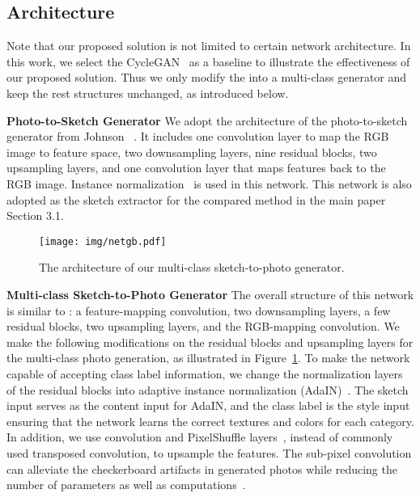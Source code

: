 \documentclass[10pt,twocolumn,letterpaper]{article}
\begin{document}
\subsection{Architecture}
\label{sec:arch}
Note that our proposed solution is not limited to certain network architecture. In this work, we select the CycleGAN~\cite{zhu2017unpaired} as a baseline to illustrate the effectiveness of our proposed solution. Thus we only modify the  into a multi-class generator and keep the rest structures unchanged, as introduced below.

\noindent \textbf{Photo-to-Sketch Generator }  We adopt the architecture of the photo-to-sketch generator from Johnson \etal~\cite{johnson2016perceptual}. It includes one convolution layer to map the RGB image to feature space, two downsampling layers, nine residual blocks, two upsampling layers, and one convolution layer that maps features back to the RGB image. Instance normalization~\cite{ulyanov2016instance} is used in this network. This network is also adopted as the sketch extractor for the compared method in the main paper Section 3.1.

\begin{figure}[tbp]
    \centering
    \texttt{[image: img/netgb.pdf]}
    \caption{The architecture of our multi-class sketch-to-photo generator.} 
    \label{fig:netGB}
\end{figure}

\noindent \textbf{Multi-class Sketch-to-Photo Generator } The overall structure of this network is similar to : a feature-mapping convolution, two downsampling layers, a few residual blocks, two upsampling layers, and the RGB-mapping convolution. We make the following modifications on the residual blocks and upsampling layers for the multi-class photo generation, as illustrated in Figure~\ref{fig:netGB}. To make the network capable of accepting class label information, we change the normalization layers of the residual blocks into adaptive instance normalization (AdaIN)~\cite{huang2017arbitrary}. The sketch input serves as the content input for AdaIN, and the class label is the style input ensuring that the network learns the correct textures and colors for each category. In addition, we use convolution and PixelShuffle layers~\cite{shi2016real}, instead of commonly used transposed convolution, to upsample the features. The sub-pixel convolution can alleviate the checkerboard artifacts in generated photos while reducing the number of parameters as well as computations~\cite{aitken2017checkerboard}.
\end{document}
